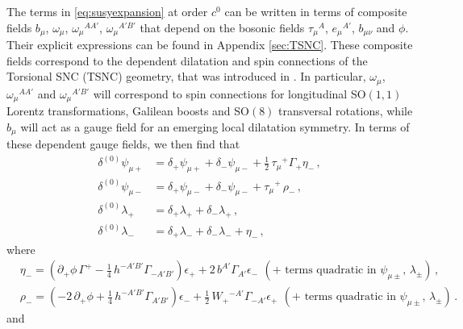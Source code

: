 \documentclass[a4paper,10pt,openany]{article}
\begin{document}
	The terms in \eqref{eq:susyexpansion} at order $c^0$ can be written in terms of composite fields $b_\mu$, $\omega_\mu$, $\omega_\mu{}^{AA'}$, $\omega_\mu{}^{A'B'}$ that depend on the bosonic fields $\tau_\mu{}^A$, $e_\mu{}^{A'}$, $b_{\mu\nu}$ and $\phi$. Their explicit expressions can be found in Appendix \ref{sec:TSNC}. These composite fields correspond to the dependent dilatation and spin connections of the Torsional SNC (TSNC) geometry, that was introduced in \cite{Bergshoeff:2021bmc}. In particular, $\omega_\mu$, $\omega_\mu{}^{AA'}$ and $\omega_\mu{}^{A'B'}$ will correspond to spin connections for longitudinal SO$(1,1)$ Lorentz transformations, Galilean boosts and SO$(8)$ transversal rotations, while $b_\mu$ will act as a gauge field for an emerging local dilatation symmetry. %
	In terms of these dependent gauge fields, we then find that
	\begin{subequations} \label{eq:deltasusy0}
		\begin{align}
			\delta^{(0)}\psi_{\mu + } &= \delta_+\psi_{\mu+} + \delta_-\psi_{\mu-} + \frac12\,\tau_\mu{}^+\Gamma_+\eta_-\,,\\
			\delta^{(0)}\psi_{\mu - } &= \delta_+\psi_{\mu-} + \delta_-\psi_{\mu-} + \tau_\mu{}^+\,\rho_-\,,\\
			\delta^{(0)}\lambda_+ &= \delta_+\lambda_+ + \delta_-\lambda_+ \,,\\
			\delta^{(0)}\lambda_-  &= \delta_+\lambda_- + \delta_-\lambda_- + \eta_-\,,
		\end{align}
	\end{subequations}
	where
	\begin{subequations} \label{eq:STrest}
		\begin{align}
			&\eta_- = \left(\partial_+\phi\,\Gamma^+ - \frac14\,h^{-A'B'}\Gamma_{-A'B'}\right)\epsilon_+ + 2\,b^{A'}\Gamma_{A'}\epsilon_- \ \, (\text{+ terms quadratic in $\psi_{\mu\pm}$, $\lambda_{\pm}$})\,,\\
			&\rho_- = \left(-2\,\partial_+\phi +\frac14\,h^{-A'B'}\Gamma_{A'B'}\right)\epsilon_- + \frac12\,W_+{}^{-A'}\Gamma_{-A'}\epsilon_+  \ \, (\text{+ terms quadratic in $\psi_{\mu\pm}$, $\lambda_{\pm}$})\,.
		\end{align}
	\end{subequations}
	and
\end{document}
